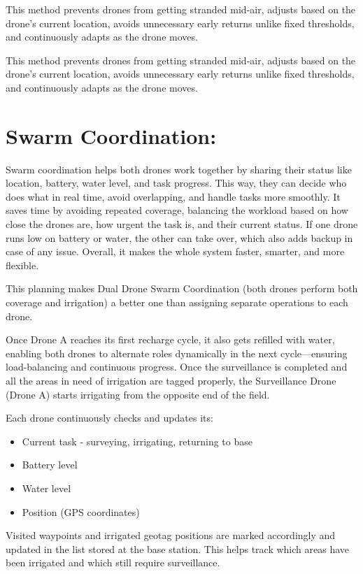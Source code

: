 \documentclass[12pt]{article}
\begin{document}
This method prevents drones from getting stranded mid-air, adjusts based on the drone’s current location, avoids unnecessary early returns unlike fixed thresholds, and continuously adapts as the drone moves.


This method prevents drones from getting stranded mid-air, adjusts based on the drone’s current location, avoids unnecessary early returns unlike fixed thresholds, and continuously adapts as the drone moves.

\section*{Swarm Coordination:}
Swarm coordination helps both drones work together by sharing their status like location, battery, water level, and task progress. This way, they can decide who does what in real time, avoid overlapping, and handle tasks more smoothly. It saves time by avoiding repeated coverage, balancing the workload based on how close the drones are, how urgent the task is, and their current status. If one drone runs low on battery or water, the other can take over, which also adds backup in case of any issue. Overall, it makes the whole system faster, smarter, and more flexible.

This planning makes Dual Drone Swarm Coordination (both drones perform both coverage and irrigation) a better one than assigning separate operations to each drone.

Once Drone A reaches its first recharge cycle, it also gets refilled with water, enabling both drones to alternate roles dynamically in the next cycle—ensuring load-balancing and continuous progress. Once the surveillance is completed and all the areas in need of irrigation are tagged properly, the Surveillance Drone (Drone A) starts irrigating from the opposite end of the field.

Each drone continuously checks and updates its:
\begin{itemize}
  \item Current task - surveying, irrigating, returning to base
  \item Battery level
  \item Water level
  \item Position (GPS coordinates)
\end{itemize}
Visited waypoints and irrigated geotag positions are marked accordingly and updated in the list stored at the base station. This helps track which areas have been irrigated and which still require surveillance.
\end{document}
